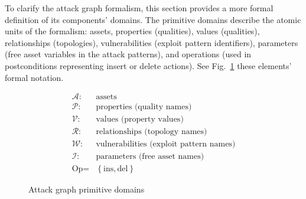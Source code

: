 \label{sec:domains}
To clarify the attack graph formalism,
this section provides a more formal definition of its components' domains.
The primitive domains describe the atomic units of
the formalism: assets, properties (qualities), values (qualities), relationships (topologies),
vulnerabilities (exploit pattern identifiers), parameters (free asset variables in the attack
patterns), and operations (used in postconditions representing insert or delete actions).
See Fig.~\ref{fig:primitivedomains} these elements' formal notation.

\begin{figure}
\begin{align*}
    \mathcal{A} :& \text{assets} \\
    \mathcal{P} :& \text{properties (quality names)} \\
    \mathcal{V} :& \text{values (property values)} \\
    \mathcal{R} :& \text{relationships (topology names)} \\
    \mathcal{W} :& \text{vulnerabilities (exploit pattern names)} \\
    \mathcal{I} :& \text{parameters (free asset names)} \\
    \text{Op} =& \left\{\text{ins}, \text{del} \right\}
\end{align*}
\caption{Attack graph primitive domains}
\label{fig:primitivedomains}
\end{figure}

